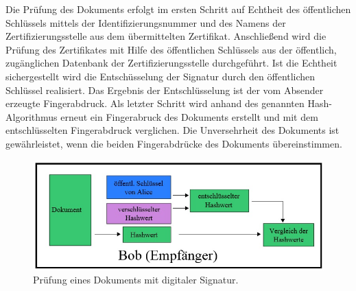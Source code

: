 Die Prüfung des Dokuments erfolgt im ersten Schritt auf Echtheit des öffentlichen Schlüssels mittels der Identifizierungsnummer und des Namens der Zertifizierungsstelle aus dem übermittelten Zertifikat. Anschließend wird die Prüfung des Zertifikates mit Hilfe des öffentlichen Schlüssels aus der öffentlich, zugänglichen Datenbank der Zertifizierungsstelle durchgeführt. Ist die Echtheit sichergestellt wird die Entschüsselung der Signatur durch den öffentlichen Schlüssel realisiert. Das Ergebnis der Entschlüsselung ist der vom Absender erzeugte Fingerabdruck. Als letzter Schritt wird anhand des genannten Hash-Algorithmus erneut ein Fingerabruck des Dokuments erstellt und mit dem entschlüsselten Fingerabdruck verglichen. Die Unversehrheit des Dokuments ist gewährleistet, wenn die beiden Fingerabdrücke des Dokuments übereinstimmen. \cite{techno1}
\begin{figure}[!ht]
    \centering
    \includegraphics[width=\textwidth]{PruefungEmpfaenger2.jpg}
    \caption[Prüfung eines Dokuments mit digitaler Signatur]{\small{Prüfung eines Dokuments mit digitaler Signatur. \cite{techno3}}}
    \label{fig:3}
\end{figure}